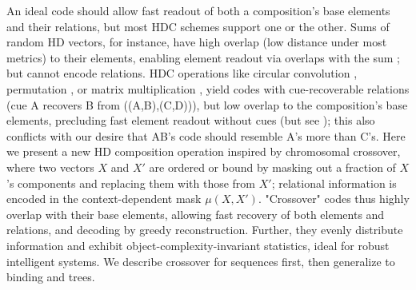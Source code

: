 \documentclass{article}
\begin{document}
An ideal code should allow fast readout of both a composition's base elements and their relations, but most HDC schemes support one or the other. Sums of random HD vectors, for instance, have high overlap (low distance under most metrics) to their elements, enabling element readout via overlaps with the sum \cite{Bloom:1970, Anderson:1973, Plate:1994}; but cannot encode relations. HDC operations like circular convolution \cite{Plate:1995}, permutation \cite{Gayler:1998, Sahlgren:2008}, or matrix multiplication \cite{Gosmann:2019}, yield codes with cue-recoverable relations (cue A recovers B from ((A,B),(C,D))), but low overlap to the composition's base elements, precluding fast element readout without cues (but see \cite{Rachkovskij:2001}); this also conflicts with our desire that AB's code should resemble A's more than C's. Here we present a new HD composition operation inspired by chromosomal crossover, where two vectors $X$ and $X'$ are ordered or bound by masking out a fraction of $X$'s components and replacing them with those from $X'$; relational information is encoded in the context-dependent mask $\mu(X, X')$. "Crossover" codes thus highly overlap with their base elements, allowing fast recovery of both elements and relations, and decoding by greedy reconstruction. Further, they evenly distribute information and exhibit object-complexity-invariant statistics, ideal for robust intelligent systems. We describe crossover for sequences first, then generalize to binding and trees.

\end{document}
